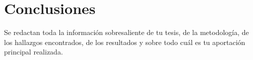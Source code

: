 \chapter{Conclusiones}\label{Cap_04}
\lettrine[lines=2,nindent=0pt]{S}{}e redactan toda la información sobresaliente de tu tesis, de la metodología, de los hallazgos encontrados, de los resultados y sobre todo cuál es tu aportación principal realizada. 
\cite{unade2025}